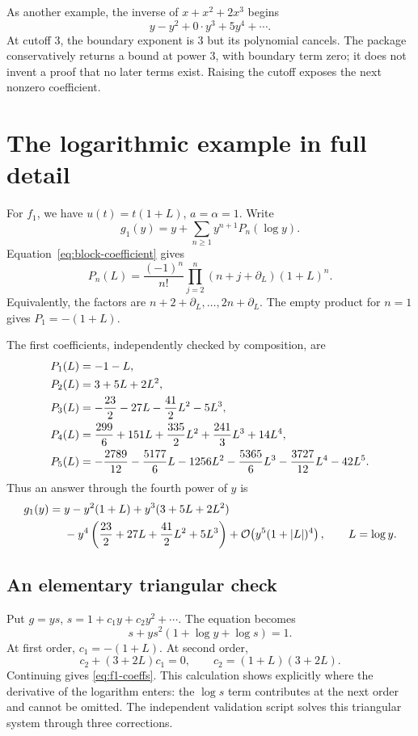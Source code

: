 \documentclass[11pt,a4paper]{article}
\numberwithin{equation}{section}
\theoremstyle{definition}\newtheorem{definition}[theorem]{Definition}
\theoremstyle{remark}\newtheorem{remark}[theorem]{Remark}
\newcommand{\bigO}{\mathcal O}
\begin{document}
As another example, the inverse of \(x+x^2+2x^3\) begins
\[
 y-y^2+0\cdot y^3+5y^4+\cdots.
\]
At cutoff \(3\), the boundary exponent is \(3\) but its polynomial cancels.
The package conservatively returns a bound at power \(3\), with boundary
term zero; it does not invent a proof that no later terms exist. Raising the
cutoff exposes the next nonzero coefficient.

\section{The logarithmic example in full detail}
\label{sec:log-example}

For \(f_1\), we have \(u(t)=t(1+L)\), \(a=\alpha=1\). Write
\begin{equation}\label{eq:f1-series}
 g_1(y)=y+\sum_{n\ge1}y^{n+1}P_n(\log y).
\end{equation}
Equation~\eqref{eq:block-coefficient} gives
\begin{equation}\label{eq:f1-polynomial}
 \boxed{\displaystyle
 P_n(L)=\frac{(-1)^n}{n!}
       \prod_{j=2}^{n}(n+j+\partial_L)(1+L)^n.}
\end{equation}
Equivalently, the factors are \(n+2+\partial_L,\ldots,2n+\partial_L\).
The empty product for \(n=1\) gives \(P_1=-(1+L)\).

The first coefficients, independently checked by composition, are
\begin{align}
 P_1(L)&=-1-L,\notag\\
 P_2(L)&=3+5L+2L^2,\notag\\
 P_3(L)&=-\frac{23}{2}-27L-\frac{41}{2}L^2-5L^3,\label{eq:f1-coeffs}\\
 P_4(L)&=\frac{299}{6}+151L+\frac{335}{2}L^2
                 +\frac{241}{3}L^3+14L^4,\notag\\
 P_5(L)&=-\frac{2789}{12}-\frac{5177}{6}L-1256L^2
 -\frac{5365}{6}L^3-\frac{3727}{12}L^4-42L^5.\notag
\end{align}
Thus an answer through the fourth power of \(y\) is
\begin{align}\label{eq:f1-answer}
 g_1(y)={}&y-y^2(1+L)+y^3(3+5L+2L^2)\notag\\
 &-y^4\left(\frac{23}{2}+27L+\frac{41}{2}L^2+5L^3\right)
 +\bigO\!\left(y^5(1+|L|)^4\right),\qquad L=\log y.
\end{align}

\subsection{An elementary triangular check}
Put \(g=y s\), \(s=1+c_1y+c_2y^2+\cdots\). The equation becomes
\[
 s+y s^2(1+\log y+\log s)=1.
\]
At first order, \(c_1=-(1+L)\). At second order,
\[
 c_2+(3+2L)c_1=0,
 \qquad c_2=(1+L)(3+2L).
\]
Continuing gives \eqref{eq:f1-coeffs}. This calculation shows explicitly
where the derivative of the logarithm enters: the \(\log s\) term contributes
at the next order and cannot be omitted. The independent validation script
solves this triangular system through three corrections.
\end{document}
